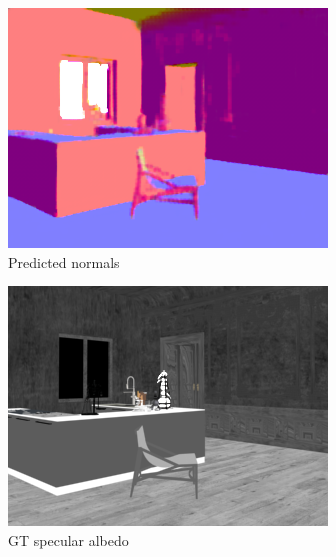 \begin{figure}
\begin{subfigure}{0.32\linewidth}
\includegraphics[width=\linewidth]{praca/images/AI43_004_Cam02.normal_output.png}
    \caption{Predicted normals}
  \end{subfigure}
  \begin{subfigure}{0.32\linewidth}
    \includegraphics[width=\linewidth]{praca/images/AI43_004_Cam02.specular.png}
    \caption{GT specular albedo}
  \end{subfigure}
  \begin{subfigure}{0.32\linewidth}

\end{subfigure}
\end{figure}
